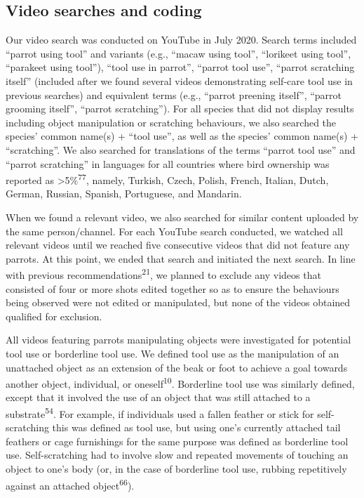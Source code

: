 \documentclass[
  man,floatsintext]{apa6}
\begin{document}
\hypertarget{video-searches-and-coding}{%
\subsection{Video searches and coding}\label{video-searches-and-coding}}

Our video search was conducted on YouTube in July 2020. Search terms included
``parrot using tool'' and variants (e.g., ``macaw using tool'', ``lorikeet using
tool'', ``parakeet using tool''), ``tool use in parrot'', ``parrot tool use'', ``parrot
scratching itself'' (included after we found several videos demonstrating
self-care tool use in previous searches) and equivalent terms (e.g., ``parrot
preening itself'', ``parrot grooming itself'', ``parrot scratching''). For all
species that did not display results including object manipulation or scratching
behaviours, we also searched the species' common name(s) + ``tool use'', as well
as the species' common name(s) + ``scratching''. We also searched for translations
of the terms ``parrot tool use'' and ``parrot scratching'' in languages for all
countries where bird ownership was reported as \textgreater5\%\textsuperscript{77}, namely,
Turkish, Czech, Polish, French, Italian, Dutch, German, Russian, Spanish,
Portuguese, and Mandarin.

When we found a relevant video, we also searched for similar content uploaded by
the same person/channel. For each YouTube search conducted, we watched all
relevant videos until we reached five consecutive videos that did not feature
any parrots. At this point, we ended that search and initiated the next search.
In line with previous recommendations\textsuperscript{21}, we planned to exclude any
videos that consisted of four or more shots edited together so as to ensure the
behaviours being observed were not edited or manipulated, but none of the videos
obtained qualified for exclusion.

All videos featuring parrots manipulating objects were investigated for
potential tool use or borderline tool use. We defined tool use as the
manipulation of an unattached object as an extension of the beak or foot to
achieve a goal towards another object, individual, or oneself\textsuperscript{10}.
Borderline tool use was similarly defined, except that it involved the use of an
object that was still attached to a substrate\textsuperscript{54}. For example, if
individuals used a fallen feather or stick for self-scratching this was defined
as tool use, but using one's currently attached tail feathers or cage
furnishings for the same purpose was defined as borderline tool use.
Self-scratching had to involve slow and repeated movements of touching an object
to one's body (or, in the case of borderline tool use, rubbing repetitively
against an attached object\textsuperscript{66}).
\end{document}
